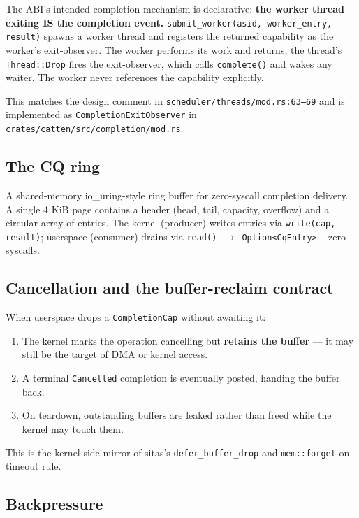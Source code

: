 The ABI's intended completion mechanism is declarative: \textbf{the worker
thread exiting IS the completion event.} \texttt{submit\_worker(asid,
worker\_entry, result)} spawns a worker thread and registers the returned
capability as the worker's exit-observer. The worker performs its work and
returns; the thread's \texttt{Thread::Drop} fires the exit-observer, which
calls \texttt{complete()} and wakes any waiter. The worker never references the
capability explicitly.

This matches the design comment in
\texttt{scheduler/threads/mod.rs:63--69} and is implemented as
\texttt{CompletionExitObserver} in
\texttt{crates/catten/src/completion/mod.rs}.

\subsection{The CQ ring}

A shared-memory io\_uring-style ring buffer for zero-syscall completion
delivery. A single 4 KiB page contains a header (head, tail, capacity,
overflow) and a circular array of entries. The kernel (producer) writes entries
via \texttt{write(cap, result)}; userspace (consumer) drains via
\texttt{read() $\rightarrow$ Option<CqEntry>} -- zero syscalls.

\subsection{Cancellation and the buffer-reclaim contract}

When userspace drops a \texttt{CompletionCap} without awaiting it:

\begin{enumerate}
    \item The kernel marks the operation cancelling but \textbf{retains the
        buffer} --- it may still be the target of DMA or kernel access.
    \item A terminal \texttt{Cancelled} completion is eventually posted,
        handing the buffer back.
    \item On teardown, outstanding buffers are leaked rather than freed while
        the kernel may touch them.
\end{enumerate}

This is the kernel-side mirror of sitas's \texttt{defer\_buffer\_drop} and
\texttt{mem::forget}-on-timeout rule.

\subsection{Backpressure}

